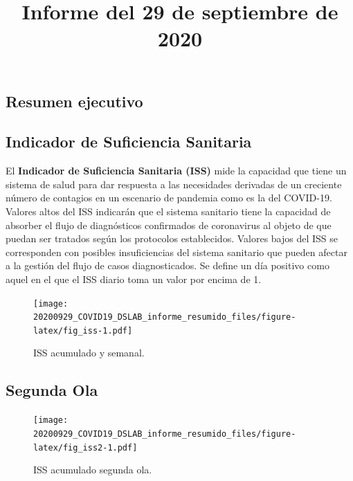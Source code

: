 \documentclass[
  11pt,
]{article}
\title{Informe del 29 de septiembre de 2020}
\author{}
\date{\vspace{-2.5em}}
\begin{document}
\maketitle

\renewcommand{\figurename}{Figura}
\renewcommand{\tablename}{Tabla}

\vspace{-0.5cm}

\hypertarget{resumen-ejecutivo}{%
\subsection{Resumen ejecutivo}\label{resumen-ejecutivo}}

\hypertarget{indicador-de-suficiencia-sanitaria}{%
\subsection{Indicador de Suficiencia
Sanitaria}\label{indicador-de-suficiencia-sanitaria}}

El \textbf{Indicador de Suficiencia Sanitaria (ISS)} mide la capacidad
que tiene un sistema de salud para dar respuesta a las necesidades
derivadas de un creciente número de contagios en un escenario de
pandemia como es la del COVID-19. Valores altos del ISS indicarán que el
sistema sanitario tiene la capacidad de absorber el flujo de
diagnósticos confirmados de coronavirus al objeto de que puedan ser
tratados según los protocolos establecidos. Valores bajos del ISS se
corresponden con posibles insuficiencias del sistema sanitario que
pueden afectar a la gestión del flujo de casos diagnosticados. Se define
un día positivo como aquel en el que el ISS diario toma un valor por
encima de 1.

\vspace{0.2cm}

\begin{figure}
\centering
\texttt{[image: 20200929\_COVID19\_DSLAB\_informe\_resumido\_files/figure-latex/fig\_iss-1.pdf]}
\caption{\label{fig:fig_iss} ISS acumulado y semanal.}
\end{figure}

\hypertarget{segunda-ola}{%
\subsection{Segunda Ola}\label{segunda-ola}}

\begin{figure}
\centering
\texttt{[image: 20200929\_COVID19\_DSLAB\_informe\_resumido\_files/figure-latex/fig\_iss2-1.pdf]}
\caption{\label{fig:fig_iss2} ISS acumulado segunda ola.}
\end{figure}
\end{document}
